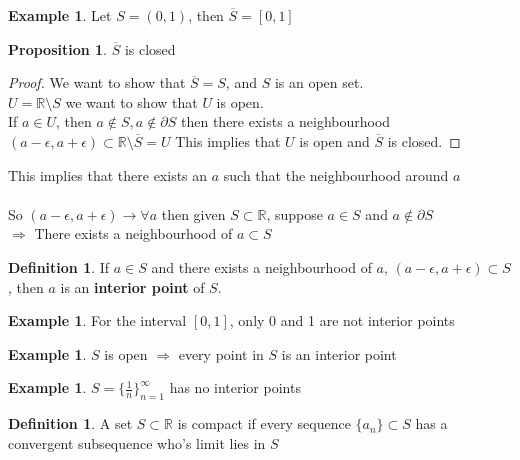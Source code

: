 \documentclass[12pt]{article}
\theoremstyle{plain}
\theoremstyle{definition}
\newtheorem{definition}[theorem]{Definition}
\newtheorem{example}[theorem]{Example}
\newtheorem{proposition}[theorem]{Proposition}
\begin{document}
\begin{example}
	Let $S = (0,1)$, then $\overline{S} = [0,1]$
\end{example}

\begin{proposition}
	$\overline{S}$ is closed
\end{proposition}

\begin{proof}
	We want to show that $\overline{S} = S$, and $S$ is an open set.\\
	$U = \mathbb{R} \setminus S$ we want to show that $U$ is open.\\
	If $a\in U$, then $a \not\in S, a \not\in \partial S$ then there exists a neighbourhood $(a-\epsilon, a+\epsilon) \subset \mathbb{R} \setminus \overline{S} = U $
	 This implies that $U$ is open and $\overline{S}$ is closed.
\end{proof}

This implies that there exists an $a$ such that the neighbourhood around $a$
\\
	 \\
	 So $(a-\epsilon, a+\epsilon) \to \forall a$ then given $S \subset \mathbb{R}$, suppose $a \in S$ and $a \not\in \partial S$\\
	  $\Longrightarrow$ There exists a neighbourhood of $a \subset S$

\begin{definition}
	If $a \in S$ and there exists a neighbourhood of $a$, $(a-\epsilon, a+\epsilon) \subset S$, then $a$ is an \textbf{interior point} of $S$.
\end{definition}

\begin{example}
	For the interval $[0,1]$, only 0 and 1 are not interior points
\end{example}

\begin{example}
	$S$ is open $\Longrightarrow$ every point in $S$ is an interior point
\end{example}

\begin{example}
	$S = \{ \frac{1}{n} \}^\infty_{n=1}$ has no interior points
\end{example}

\begin{definition}
	A set $S \subset \mathbb{R}$ is compact if every sequence $\{ a_n \} \subset S $ has a convergent subsequence who's limit lies in $S$
\end{definition}
\end{document}
